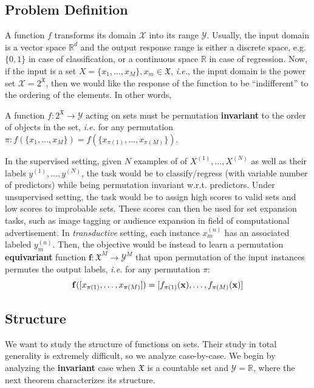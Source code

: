 \documentclass{article}
\newcommand{\xx}[0]{\ensuremath{\mathbf{x}}}
\newcommand{\ff}[0]{\ensuremath{\mathbf{f}}}
\newcommand{\latinphrase}[1]{\emph{#1}}    %
\newcommand{\ie}{\latinphrase{i.e.}\xspace}
\begin{document}
\subsection{Problem Definition} 
A function $f$ transforms its domain $\mathcal{X}$ into its range $\mathcal{Y}$. Usually, the input domain is a vector space $\mathbb{R}^d$ and the output response range is either a discrete space, e.g. $\{0,1\}$ in case of classification, or a continuous space $\mathbb{R}$ in case of regression. Now, if the input is a set $X=\{x_1,\ldots,x_M\}, x_m\in \mathfrak{X}$, \ie, the input domain is the power set $\mathcal{X}=2^\mathfrak{X}$, then we would like the response of the function to be ``indifferent''  to the ordering of the elements.  In other words,
\vspace{-3mm}
\begin{property}\label{prop:invariant}
A function $f:2^\mathfrak{X}\to\mathcal{Y}$ acting on sets must be permutation \textbf{invariant} to the order of objects in the set, \ie for any permutation $\pi: f(\{x_1,\ldots,x_M\}) = f(\{x_{\pi(1)},\ldots,x_{\pi(M)}\}) $.
\end{property}
\vspace{-4mm}
In the supervised setting, given $N$ examples of of $X^{(1)},. . . ,X^{(N)}$ as well as their labels $y^{(1)},...,y^{(N)}$, the task would be to classify/regress (with variable number of predictors) while being permutation invariant w.r.t. predictors. Under unsupervised setting, the task would be to assign high scores to valid sets and low scores to improbable sets. 
These scores can then be used for set expansion tasks, such as image tagging or audience expansion in field of computational advertisement.
In \textit{transductive} setting, each instance $x_{m}^{(n)}$ has an associated labeled $y_{m}^{(n)}$. Then, the objective would be instead to learn a permutation \textbf{equivariant} function $\ff: \mathfrak{X}^{M} \to \mathcal{Y}^{M}$ that upon permutation of the input instances permutes the output labels, \ie  for any permutation $\pi$:
\begin{equation}
\vspace{-1mm}
\ff([x_{\pi(1)},\ldots, x_{\pi(M)}]) = [f_{\pi(1)}(\xx), \ldots, f_{\pi(M)}(\xx)]
\label{prop:equivariant}
\end{equation}
\vspace{-3mm}

\subsection{Structure}
We want to study the structure of functions on sets.
Their study in total generality is extremely difficult, so we analyze case-by-case. We begin by analyzing the \textbf{invariant} case when $\mathfrak{X}$ is a countable set and $\mathcal{Y} = \mathbb{R}$, where the next theorem characterizes its structure.
\end{document}
